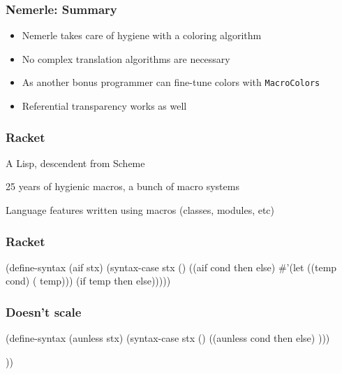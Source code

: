 \documentclass[hyperref={bookmarks=false}]{beamer}
\begin{document}
\begin{frame}[fragile]
\frametitle{Nemerle: Summary}
\begin{itemize}
\item Nemerle takes care of hygiene with a coloring algorithm
\item No complex translation algorithms are necessary
\item As another bonus programmer can fine-tune colors with \texttt{MacroColors}
\item Referential transparency works as well
\end{itemize}
\end{frame}

\begin{frame}[fragile]
\frametitle{Racket}
A Lisp, descendent from Scheme

25 years of hygienic macros, a bunch of macro systems

Language features written using macros (classes, modules, etc)
\end{frame}

\begin{frame}[fragile]
\frametitle{Racket}
\begin{semiverbatim}

(define-syntax (aif stx)
  (syntax-case stx ()
    ((aif cond then else)
       #'(let ((temp cond)
               ( temp)))
           (if temp then else)))))

\end{semiverbatim}
\end{frame}

\begin{frame}[fragile]
\frametitle{Doesn't scale}
\begin{semiverbatim}

(define-syntax (aunless stx)
  (syntax-case stx ()
    (\alert<1>{(aunless cond then else)}
     )))

        
    ))
\end{semiverbatim}
\end{frame}
\end{document}
